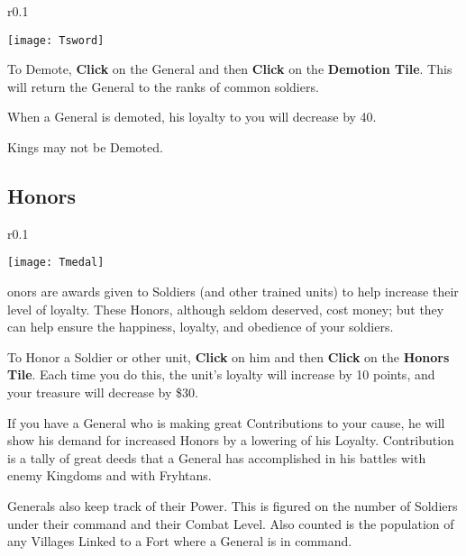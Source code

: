 \begin{wrapfigure}{r}{0.1\textwidth}
    \vspace{-20pt}
    \begin{center}
        \texttt{[image: Tsword]}
    \end{center}
    \vspace{-20pt}
\end{wrapfigure}

To Demote, \textbf{Click} on the General and then \textbf{Click} on the \textbf{Demotion Tile}. This will return the General to the ranks of common soldiers.

When a General is demoted, his loyalty to you will decrease by 40.

Kings may not be Demoted.

\subsection{\textsf{Honors}}


\begin{wrapfigure}{r}{0.1\textwidth}
    \vspace{-20pt}
    \begin{center}
        \texttt{[image: Tmedal]}
    \end{center}
    \vspace{-20pt}
\end{wrapfigure}


onors are awards given to Soldiers (and other trained units) to help increase their level of loyalty. These Honors, although seldom deserved, cost money; but they can help ensure the happiness, loyalty, and obedience of your soldiers.

To Honor a Soldier or other unit, \textbf{Click} on him and then \textbf{Click} on the \textbf{Honors Tile}. Each time you do this, the unit’s loyalty will increase by 10 points, and your treasure will decrease by \$30.

If you have a General who is making great Contributions to your cause, he will show his demand for increased Honors by a lowering of his Loyalty. Contribution is a tally of great deeds that a General has accomplished in his battles with enemy Kingdoms and with Fryhtans.

Generals also keep track of their Power. This is figured on the number of Soldiers under their command and their Combat Level. Also counted is the population of any Villages Linked to a Fort where a General is in command.

